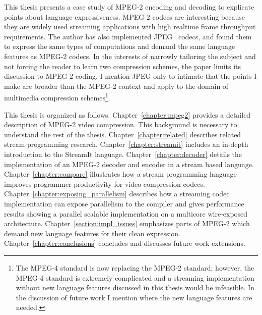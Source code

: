 This thesis presents a case study of MPEG-2 encoding and decoding to explicate 
points about language expressiveness. 
MPEG-2 codecs are interesting because they are widely used
streaming applications with high realtime frame throughput requirements.
The author has also implemented JPEG~\cite{JPEG} codecs, and
found them to express the same types of computations and demand the same language features 
as MPEG-2 codecs. 
In the interests of narrowly tailoring the subject and not forcing the 
reader to learn two compression schemes, the paper limits its discussion to MPEG-2 coding. 
I mention JPEG only to intimate that the points I make are broader than the MPEG-2 context 
and apply to the domain of multimedia compression schemes\footnote{The MPEG-4 standard is now
replacing the MPEG-2 standard; however, the MPEG-4 standard is extremely complicated and 
a streaming implementation without new language features discussed in this thesis would be
infeasible. In the discussion of future work I mention where the new 
language features are needed.}.

This thesis is organized as follows. Chapter~\ref{chapter:mpeg2} provides a
detailed description of MPEG-2 video compression. This background 
is necessary to understand the rest of the thesis. 
Chapter~\ref{chapter:related} describes related stream programming 
research. 
Chapter~\ref{chapter:streamit} includes an in-depth 
introduction to the StreamIt language. 
Chapter~\ref{chapter:decoder} details the implementation
of an MPEG-2 decoder and encoder in a stream based language. 
Chapter~\ref{chapter:compare} illustrates how a stream 
programming language improves programmer productivity for video 
compression codecs. Chapter~\ref{chapter:exposing_parallelism} describes 
how a streaming codec implementation can expose parallelism to the 
compiler and gives performance results showing a parallel scalable 
implementation on a 
multicore wire-exposed architecture. 
Chapter~\ref{section:impl_issues} emphasizes parts of MPEG-2 
which demand new language features for their clean expression. 
Chapter~\ref{chapter:conclusions}
concludes and discusses future work extensions.
